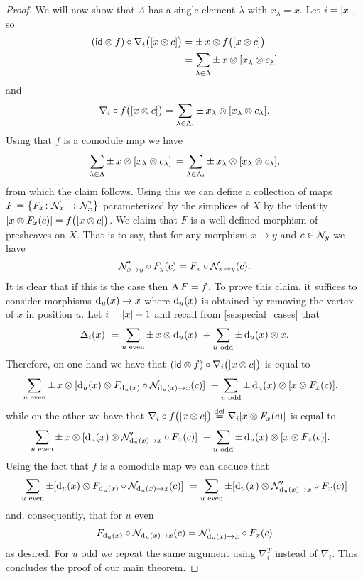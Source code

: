 \begin{proof}
	We will now show that $\Lambda$ has a single element $\lambda$ with $x_\lambda = x$.
	Let $i = \bars{x}$, so
	\begin{align*}
		(\id \ot f) \circ \nabla_i \big( [x \ot c] \big) &=
		\pm \, x \ot f \big( [x \ot c] \big) \\&=
		\sum_{\lambda \in \Lambda} \pm \, x \ot [x_\lambda \ot c_\lambda]
	\end{align*}
	and
	\[
	\nabla_i \circ f \big( [x \ot c] \big) =
	\sum_{\lambda \in \Lambda_i} \pm \, x_\lambda \ot [x_\lambda \ot c_\lambda].
	\]
	Using that $f$ is a comodule map we have
	\[
	\sum_{\lambda \in \Lambda} \pm \, x \ot [x_\lambda \ot c_\lambda] \, =
	\sum_{\lambda \in \Lambda_i} \pm \, x_\lambda \ot [x_\lambda \ot c_\lambda],
	\]
	from which the claim follows.
	Using this we can define a collection of maps $F = \set[\big]{F_x \colon \cN_x \to \cN'_x}$ parameterized by the simplices of $X$ by the identity $[x \ot F_x(c)] = f \big( [x \ot c] \big)$.
	We claim that $F$ is a well defined morphism of presheaves on $X$.
	That is to say, that for any morphism $x \to y$ and $c \in \cN_y$ we have
	\[
	\cN'_{x \to y} \circ F_y(c) = F_x \circ \cN_{x \to y}(c).
	\]
	It is clear that if this is the case then $\assembly F = f$.
	To prove this claim, it suffices to consider morphisms $\face_u(x) \to x$ where $\face_u(x)$ is obtained by removing the vertex of $x$ in position $u$.
	Let $i = \bars{x}-1$ and recall from \cref{ss:special_cases} that
	\[
	\copr_i(x) \ =
	\sum_{u \text{ even}} \pm \, x \ot \face_u(x) \ +
	\sum_{u \text{ odd}} \pm \face_u(x) \ot x.
	\]
	Therefore, on one hand we have that $(\id \ot f) \circ \nabla_i \big( [x \ot c] \big)$ is equal to
	\begin{align*}
		&\sum_{u \text{ even}} \pm \, x \ot [\face_u(x) \ot F_{\face_u(x)} \circ \cN_{\face_u(x) \to x}(c)] \ +
		\sum_{u \text{ odd}} \pm \face_u(x) \ot [x \ot F_x(c)],
	\end{align*}
	while on the other we have that $\nabla_i \circ f \big( [x \ot c] \big) \defeq \nabla_i [x \ot F_x(c)]$ is equal to
	\begin{align*}
		&\sum_{u \text{ even}} \pm \, x \ot [\face_u(x) \ot \cN'_{\face_u(x) \to x} \circ F_x(c)] \ +
		\sum_{u \text{ odd}} \pm \face_u(x) \ot [x \ot F_x(c)].
	\end{align*}
	Using the fact that $f$ is a comodule map we can deduce that
	\[
	\sum_{u \text{ even}} \pm [\face_u(x) \ot F_{\face_u(x)} \circ \cN_{\face_u(x) \to x}(c)] \ =
	\sum_{u \text{ even}} \pm [\face_u(x) \ot \cN'_{\face_u(x) \to x} \circ F_x(c)]
	\]
	and, consequently, that for $u$ even
	\[
	F_{\face_u(x)} \circ \cN_{\face_u(x) \to x}(c) =
	\cN'_{\face_u(x) \to x} \circ F_{x}(c)
	\]
	as desired.
	For $u$ odd we repeat the same argument using $\nabla_i^T$ instead of $\nabla_i$.
	This concludes the proof of our main theorem.
\end{proof}